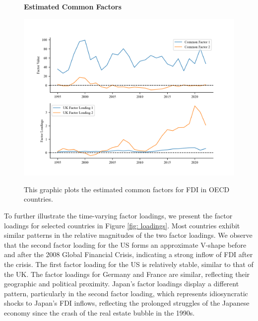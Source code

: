 \documentclass[12pt]{article}
\begin{document}
    \begin{figure}[!ht]
        \centering
        \caption{\textbf{Estimated Common Factors}}
        \includegraphics{figs/factors_ipca.png}
        \label{fig: factors}
        \caption*{\footnotesize{This graphic plots the estimated common factors for FDI in OECD countries.}}
    \end{figure}
    
To further illustrate the time-varying factor loadings, we present the factor loadings for selected countries in Figure \ref{fig: loadings}. Most countries exhibit similar patterns in the relative magnitudes of the two factor loadings. We observe that the second factor loading for the US forms an approximate V-shape before and after the 2008 Global Financial Crisis, indicating a strong inflow of FDI after the crisis. The first factor loading for the US is relatively stable, similar to that of the UK. The factor loadings for Germany and France are similar, reflecting their geographic and political proximity. Japan's factor loadings display a different pattern, particularly in the second factor loading, which represents idiosyncratic shocks to Japan's FDI inflows, reflecting the prolonged struggles of the Japanese economy since the crash of the real estate bubble in the 1990s.
    
\end{document}
